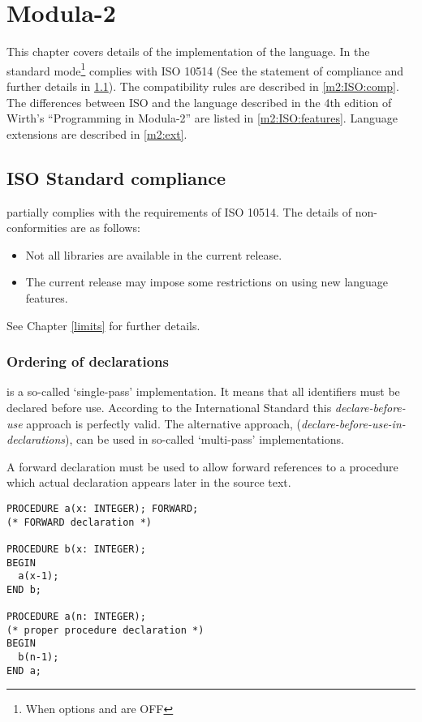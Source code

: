 \chapter{\XDS{} Modula-2}\label{m2}

This chapter covers details of the \XDS{} implementation of
the \mt{} language. In the standard
mode\footnote{When options  and 
are OFF} \xds{} \mt{} complies with ISO 10514 (See
the statement of compliance and further details in \ref{m2:ISO}).
The compatibility rules are described in \ref{m2:ISO:comp}. The
differences between ISO \mt{} and the language described in
the 4th edition of Wirth's ``Programming in Modula-2'' 
\ifonline\else\cite{PIM}\fi %
are listed in \ref{m2:ISO:features}. Language extensions are
described in \ref{m2:ext}.

\section{ISO Standard compliance}\label{m2:ISO}

\xds{} \mt{} partially complies with the requirements
of ISO 10514. The details of non-conformities are as follows:
\begin{itemize}
\item Not all libraries are available in the current release.
\item The current release may impose some restrictions
      on using new language features.
\end{itemize}
See Chapter \ref{limits} for further details.

\subsection{Ordering of declarations}\label{m2:dcl:order}

\xds{} \mt{} is a so-called `single-pass' implementation. It
means that all identifiers must be declared before use.
According to the International Standard this
{\em declare-before-use} approach is perfectly valid. The
alternative approach, ({\em declare-before-use-in-declarations}), can
be used in so-called `multi-pass' implementations.

A forward declaration must be used to allow forward references
to a procedure which actual declaration appears later in the
source text.

\Example
\begin{verbatim}
PROCEDURE a(x: INTEGER); FORWARD;
(* FORWARD declaration *)

PROCEDURE b(x: INTEGER);
BEGIN
  a(x-1);
END b;

PROCEDURE a(n: INTEGER);
(* proper procedure declaration *)
BEGIN
  b(n-1);
END a;
\end{verbatim}

